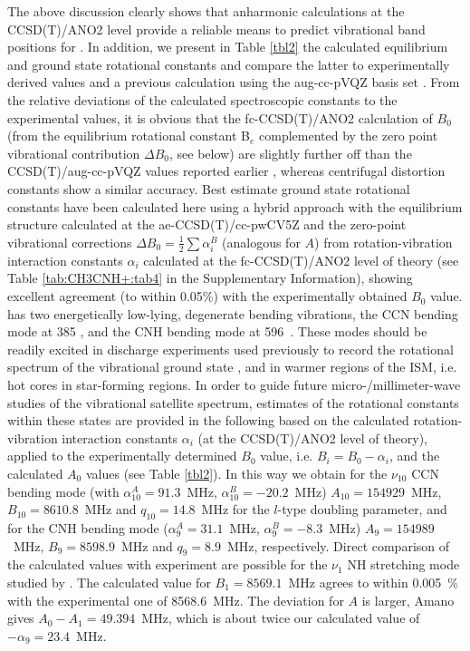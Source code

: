 The above discussion clearly shows that anharmonic calculations at the \\CCSD(T)/ANO2 level provide a reliable means to predict vibrational band positions for \pan. In addition, we present in Table \ref{tbl2} the calculated equilibrium and ground state rotational constants and compare the latter to experimentally derived values \cite{GAM2000,AHH2006} and a previous calculation using the aug-cc-pVQZ basis set \cite{Cerqueira2020}. 
From the relative deviations of the calculated spectroscopic constants to the experimental values, it is obvious that the fc-CCSD(T)/ANO2 calculation of $B_0$ (from the equilibrium rotational constant B$_e$ complemented by the zero point vibrational contribution $\Delta B_0$, see below) are slightly further off than the CCSD(T)/aug-cc-pVQZ values
reported earlier \cite{Cerqueira2020}, whereas centrifugal distortion constants show a similar accuracy. 
Best estimate ground state rotational constants have been calculated here using a hybrid approach with the equilibrium structure
calculated at the ae-CCSD(T)/cc-pwCV5Z and the zero-point vibrational corrections $\Delta B_{0}=\frac{1}{2}\sum{\alpha_i^B}$ (analogous for $A$) from rotation-vibration interaction constants $\alpha_i$ calculated at the fc-CCSD(T)/ANO2 level of theory (see Table \ref{tab:CH3CNH+:tab4} in the Supplementary Information), showing excellent agreement (to within 0.05\%) with the experimentally obtained $B_0$ value. 
\pa has two energetically low-lying, degenerate bending vibrations, the CCN bending mode at 385 \wn, and the CNH bending mode at 596~\wn. These modes should be readily excited in discharge experiments used previously to record the rotational spectrum of the vibrational ground state \cite{GAM2000,AHH2006}, and in warmer regions of the ISM, i.e. hot cores in star-forming regions. In order to guide future micro-/millimeter-wave studies of the vibrational satellite spectrum, estimates of the rotational constants within these states are provided in the following based on the calculated rotation-vibration interaction constants $\alpha_i$ (at the CCSD(T)/ANO2 level of theory), applied to the experimentally determined $B_0$ value, i.e. $B_i=B_0-\alpha_i$, and the calculated $A_0$ values (see Table \ref{tbl2}). In this way we obtain for the $\nu_{10}$ CCN bending mode (with $\alpha^A_{10}=91.3$~MHz, $\alpha^B_{10}=-20.2$~MHz) $A_{10}=154929$~MHz, $B_{10}=8610.8$~MHz and $q_{10}=14.8$~MHz for the $l$-type doubling parameter, and for the CNH bending mode ($\alpha^A_{9}=31.1$~MHz, $\alpha^B_{9}=-8.3$~MHz) $A_9=154989$~MHz, $B_9=8598.9$~MHz and $q_9=8.9$~MHz, respectively. 
Direct comparison of the calculated values with experiment are possible for the $\nu_1$ NH stretching mode studied by \citet{Amano1992}. The calculated value for $B_1=8569.1$~MHz agrees to within 0.005~\% with the experimental one of 8568.6~MHz. The deviation for $A$ is larger, Amano gives $A_0-A_1=49.394$~MHz, which is about twice our calculated value of $-\alpha _9=23.4$~MHz.   

